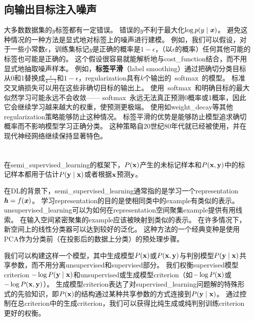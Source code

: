
\subsection{向输出目标注入噪声}
\label{sec:injecting_noise_at_the_output_targets}
大多数数据集的$y$标签都有一定错误。
错误的$y$不利于最大化$\log p(y \mid \boldsymbol{\mathit{x}})$。
避免这种情况的一种方法是显式地对标签上的噪声进行建模。
例如，我们可以假设，对于一些小常数$\epsilon$，训练集标记$y$是正确的概率是$1-\epsilon$，（以$\epsilon$的概率）任何其他可能的标签也可能是正确的。
这个假设很容易就能解析地与\gls{cost_function}结合，而不用显式地抽取噪声样本。
例如，\textbf{标签平滑}（label smoothing）通过把确切分类目标从0和1替换成$\frac{\epsilon}{k-1}$和$1-\epsilon$，\gls{regularization}具有$k$个输出的~\gls{softmax}~的模型。
标准交叉熵损失可以用在这些非确切目标的输出上。
使用~\gls{softmax}~和明确目标的最大似然学习可能永远不会收敛——
\gls{softmax}~永远无法真正预测0概率或1概率，因此它会继续学习越来越大的权重，使预测更极端。
使用如\gls{weight_decay}等其他\gls{regularization}策略能够防止这种情况。
标签平滑的优势是能够防止模型追求确切概率而不影响模型学习正确分类。
这种策略自20世纪80年代就已经被使用，并在现代神经网络继续保持显著特色\citep{Szegedy-et-al-2015}。


\section{}
\label{sec:semi_supervised_learning}
在\gls{semi_supervised_learning}的框架下，$P(\mathbf{x})$产生的未标记样本和$P(\mathbf{x}, \mathbf{y})$中的标记样本都用于估计$P(\mathbf{y} \mid \mathbf{x})$或者根据$\mathbf{x}$预测$\mathbf{y}$。

在\gls{DL}的背景下，\gls{semi_supervised_learning}通常指的是学习一个\gls{representation} $\boldsymbol{\mathit{h}} = f(\boldsymbol{\mathit{x}})$。 
学习\gls{representation}的目的是使相同类中的\gls{example}有类似的表示。
\gls{unsupervised_learning}可以为如何在\gls{representation}空间聚集\gls{example}提供有用线索。
在输入空间紧密聚集的\gls{example}应该被映射到类似的表示。
在许多情况下，新空间上的线性分类器可以达到较好的泛化\citep{Belkin+Niyogi-2002,Chapelle+al-2003}。
这种方法的一个经典变种是使用\gls{PCA}作为分类前（在投影后的数据上分类）的预处理步骤。

我们可以构建这样一个模型，其中生成模型$P(\mathbf{x})$或$P(\mathbf{x}, \mathbf{y})$与判别模型$P(\mathbf{y} \mid \mathbf{x})$共享参数，而不用分离\gls{unsupervised}和\gls{supervised}部分。
我们权衡\gls{supervised}模型\gls{criterion} $-\log P(\mathbf{y} \mid \mathbf{x})$和\gls{unsupervised}或生成模型\gls{criterion}（如$-\log P(\mathbf{x})$或$-\log P(\mathbf{x}, \mathbf{y})$）。
生成模型\gls{criterion}表达了对\gls{supervised_learning}问题解的特殊形式的先验知识\citep{LasserreJ2006}，即$P(\mathbf{x})$的结构通过某种共享参数的方式连接到$P(\mathbf{y} \mid \mathbf{x})$。
通过控制在总\gls{criterion}中的生成\gls{criterion}，我们可以获得比纯生成或纯判别训练\gls{criterion}更好的权衡\citep{LasserreJ2006,Larochelle+Bengio-2008-small}。

